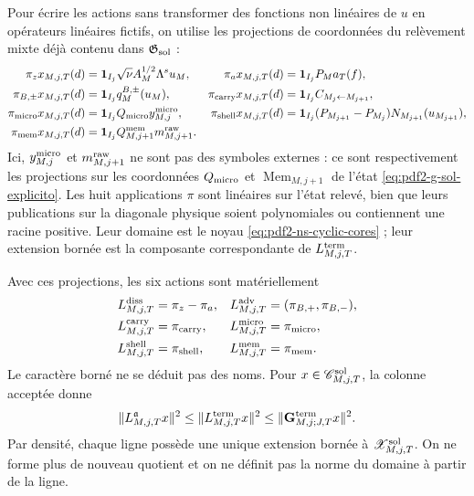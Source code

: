 Pour écrire les actions sans transformer des fonctions non linéaires de $u$ en
opérateurs linéaires fictifs, on utilise les projections de coordonnées du relèvement
mixte déjà contenu dans $\mathfrak G_{\rm sol}$ :
\begin{equation}\label{eq:pdf2-ns-row-coordinate-readers}
 \begin{aligned}
 \pi_zx_{M,j,T}(d)&=\mathbf1_{I_j}\sqrt\nu A_M^{1/2}\Lambda^su_M,&
 \pi_ax_{M,j,T}(d)&=\mathbf1_{I_j}P_Ma_T(f),\\
 \pi_{B,\pm}x_{M,j,T}(d)&=\mathbf1_{I_j}q_M^{B,\pm}(u_M),&
 \pi_{\rm carry}x_{M,j,T}(d)&=\mathbf1_{I_j}C_{M_j\leftarrow M_{j+1}},\\
 \pi_{\rm micro}x_{M,j,T}(d)&=\mathbf1_{I_j}Q_{\rm micro}y^{\rm micro}_{M,j},&
 \pi_{\rm shell}x_{M,j,T}(d)&=\mathbf1_{I_j}
 (P_{M_{j+1}}-P_{M_j})N_{M_{j+1}}(u_{M_{j+1}}),\\
 \pi_{\rm mem}x_{M,j,T}(d)&=\mathbf1_{I_j}
 Q^{\rm mem}_{M,j+1}m^{\rm raw}_{M,j+1}.&&
 \end{aligned}
\end{equation}
Ici, $y^{\rm micro}_{M,j}$ et $m^{\rm raw}_{M,j+1}$ ne sont pas des symboles
externes : ce sont respectivement les projections sur les coordonnées
$Q_{\rm micro}$ et $\operatorname{Mem}_{M,j+1}$ de l'état
\eqref{eq:pdf2-g-sol-explicito}. Les huit applications $\pi$ sont linéaires sur
l'état relevé, bien que leurs publications sur la diagonale physique soient
polynomiales ou contiennent une racine positive. Leur domaine est le noyau
\eqref{eq:pdf2-ns-cyclic-cores} ; leur extension bornée est la composante
correspondante de $L_{M,j,T}^{\rm term}$.

Avec ces projections, les six actions sont matériellement
\begin{equation}\label{eq:pdf2-ns-six-loss-actions}
 \begin{aligned}
 L^{\rm diss}_{M,j,T}&=\pi_z-\pi_a,&
 L^{\rm adv}_{M,j,T}&=(\pi_{B,+},\pi_{B,-}),\\
 L^{\rm carry}_{M,j,T}&=\pi_{\rm carry},&
 L^{\rm micro}_{M,j,T}&=\pi_{\rm micro},\\
 L^{\rm shell}_{M,j,T}&=\pi_{\rm shell},&
 L^{\rm mem}_{M,j,T}&=\pi_{\rm mem}.
 \end{aligned}
\end{equation}
Le caractère borné ne se déduit pas des noms. Pour
$x\in\mathscr C_{M,j,T}^{\rm sol}$, la colonne acceptée donne
\begin{equation}\label{eq:pdf2-ns-row-boundedness}
 \|L_{M,j,T}^{\mathfrak a}x\|^2
 \le\|L_{M,j,T}^{\rm term}x\|^2
 \le\|\mathbf G_{M,j;J,T}^{\rm term}x\|^2.
\end{equation}
Par densité, chaque ligne possède une unique extension bornée à
$\mathscr X_{M,j,T}^{\rm sol}$. On ne forme plus de nouveau quotient et on ne définit pas
la norme du domaine à partir de la ligne.

